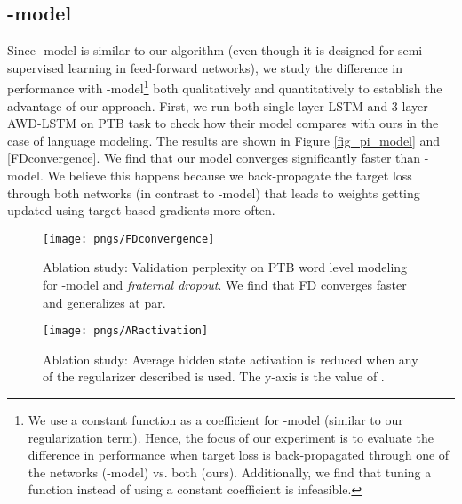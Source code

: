 \documentclass{article} \usepackage{iclr2018_conference,times}
\begin{document}
\subsection{\texorpdfstring{}{TEXT}-model}\label{semisupervised}
Since -model \cite{laine2016temporal} is similar to our algorithm (even though it is designed for semi-supervised learning in feed-forward networks), we study the difference in performance with -model\footnote{We use a constant function  as a coefficient for -model (similar to our regularization term). Hence, the focus of our experiment is to evaluate the difference in performance when target loss is back-propagated through one of the networks (-model) vs. both (ours). Additionally, we find that tuning a function instead of using a constant coefficient is infeasible.} both qualitatively and quantitatively to establish the advantage of our approach. First, we run both single layer LSTM and 3-layer AWD-LSTM on PTB task to check how their model compares with ours in the case of language modeling. The results are shown in Figure \ref{fig_pi_model} and \ref{FDconvergence}. We find that our model converges significantly faster than -model. We believe this happens because we back-propagate the target loss through both networks (in contrast to -model) that leads to weights getting updated using target-based gradients more often. 

\begin{figure}[t]
\vspace{-0.08cm}
  \centering
  \begin{minipage}[b]{0.48\textwidth}
    \texttt{[image: pngs/FDconvergence]}
    \caption{Ablation study: Validation perplexity on PTB word level modeling for -model and \emph{fraternal dropout}. We find that FD converges faster and generalizes at par.}
    \label{FDconvergence}
  \end{minipage}
  \hfill
  \begin{minipage}[b]{0.48\textwidth}
    \texttt{[image: pngs/ARactivation]}
    \caption{Ablation study: Average hidden state activation is reduced when any of the regularizer described is used. The y-axis is the value of .}
    \label{ARactivation}
  \end{minipage}
\vspace{-0.08cm}
\end{figure}
\end{document}
